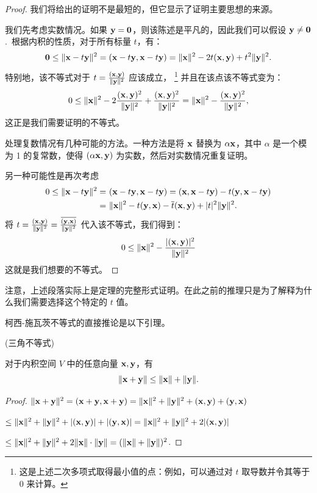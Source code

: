 \begin{proof}我们将给出的证明不是最短的，但它显示了证明主要思想的来源。

我们先考虑实数情况。如果 $\mathbf{y} = \mathbf{0}$，则该陈述是平凡的，因此我们可以假设 $\mathbf{y} \ne \mathbf{0}$.~根据内积的性质，对于所有标量 $t$，有：
$$\mathbf{0} \le \|\mathbf{x} - t\mathbf{y}\|^2 = (\mathbf{x} - t\mathbf{y}, \mathbf{x} - t\mathbf{y}) = \|\mathbf{x}\|^2 - 2t(\mathbf{x}, \mathbf{y}) + t^2 \|\mathbf{y}\|^2.$$
特别地，该不等式对于 $t = \frac{(\mathbf{x}, \mathbf{y})}{\|\mathbf{y}\|^2}$ 应该成立，
\footnote{
这是上述二次多项式取得最小值的点：例如，可以通过对 $t$ 取导数并令其等于 0 来计算。
}
并且在该点该不等式变为：
$$0 \le \|\mathbf{x}\|^2 - 2 \frac{(\mathbf{x}, \mathbf{y})^2}{\|\mathbf{y}\|^2} + \frac{(\mathbf{x}, \mathbf{y})^2}{\|\mathbf{y}\|^2} = \|\mathbf{x}\|^2 - \frac{(\mathbf{x}, \mathbf{y})^2}{\|\mathbf{y}\|^2},$$
这正是我们需要证明的不等式。

处理复数情况有几种可能的方法。一种方法是将 $\mathbf{x}$ 替换为 $\alpha \mathbf{x}$，其中 $\alpha$ 是一个模为 1 的复常数，使得 $(\alpha \mathbf{x}, \mathbf{y})$ 为实数，然后对实数情况重复证明。

另一种可能性是再次考虑
\begin{equation} \notag
\begin{split}
0 \le \|\mathbf{x} - t\mathbf{y}\|^2
=&\  (\mathbf{x} - t\mathbf{y}, \mathbf{x} - t\mathbf{y}) = (\mathbf{x}, \mathbf{x} - t\mathbf{y}) - t(\mathbf{y}, \mathbf{x} - t\mathbf{y}) \\
=&\  \|\mathbf{x}\|^2 - t(\mathbf{y}, \mathbf{x}) - \overline{t}(\mathbf{x}, \mathbf{y}) + |t|^2 \|\mathbf{y}\|^2.\end{split}\end{equation}
将 $t = \frac{(\mathbf{x}, \mathbf{y})}{\|\mathbf{y}\|^2} = \frac{\overline{(\mathbf{y}, \mathbf{x})}}{\|\mathbf{y}\|^2}$ 代入该不等式，我们得到：
$$0 \le \|\mathbf{x}\|^2 - \frac{|(\mathbf{x}, \mathbf{y})|^2}{\|\mathbf{y}\|^2}$$
这就是我们想要的不等式。\end{proof}

注意，上述段落实际上是定理的完整形式证明。在此之前的推理只是为了解释为什么我们需要选择这个特定的 $t$ 值。

柯西-施瓦茨不等式的直接推论是以下引理。

\begin{lemma}\label{stmt:05-01-08}  (三角不等式)

对于内积空间 $V$ 中的任意向量 $\mathbf{x}, \mathbf{y}$，有 $$\|\mathbf{x} + \mathbf{y}\| \le \|\mathbf{x}\| + \|\mathbf{y}\|.$$\end{lemma}

\begin{proof}
$\|\mathbf{x} + \mathbf{y}\|^2 = (\mathbf{x} + \mathbf{y}, \mathbf{x} + \mathbf{y}) = \|\mathbf{x}\|^2 + \|\mathbf{y}\|^2 + (\mathbf{x}, \mathbf{y}) + (\mathbf{y}, \mathbf{x})$

$\le \|\mathbf{x}\|^2 + \|\mathbf{y}\|^2 + |(\mathbf{x}, \mathbf{y})| + |(\mathbf{y}, \mathbf{x})| = \|\mathbf{x}\|^2 + \|\mathbf{y}\|^2 + 2 |(\mathbf{x}, \mathbf{y})|$

$\le \|\mathbf{x}\|^2 + \|\mathbf{y}\|^2 + 2 \|\mathbf{x}\| \cdot \|\mathbf{y}\| = (\|\mathbf{x}\| + \|\mathbf{y}\|)^2$.\end{proof}

